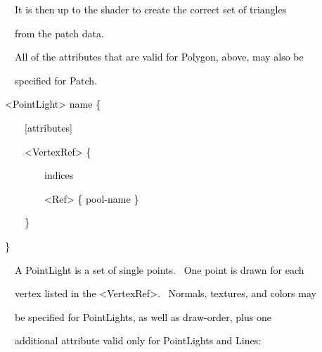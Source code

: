 \documentclass[a4paper]{article}
\newcommand\textstyleOOoComputerKeyWord[1]{\textrm{\textcolor[rgb]{0.0,0.0,0.5019608}{#1}}}
\begin{document}
{\color{black}
\textstyleOOoComputerKeyWord{\textcolor{black}{\ \ It is then up to the shader to create the correct set of triangles}}}

{\color{black}
\textstyleOOoComputerKeyWord{\textcolor{black}{\ \ from the patch data.}}}


\bigskip

{\color{black}
\textstyleOOoComputerKeyWord{\textcolor{black}{\ \ All of the attributes that are valid for Polygon, above, may also
be}}}

{\color{black}
\textstyleOOoComputerKeyWord{\textcolor{black}{\ \ specified for Patch.}}}

\clearpage
\bigskip


\bigskip


\bigskip

{\color{black}
\textstyleOOoComputerKeyWord{\textcolor{black}{{\textless}PointLight{\textgreater} name \{ }}}

{\color{black}
\textstyleOOoComputerKeyWord{\textcolor{black}{\ \ \ \ [attributes] }}}

{\color{black}
\textstyleOOoComputerKeyWord{\textcolor{black}{\ \ \ \ {\textless}VertexRef{\textgreater} \{ }}}

{\color{black}
\textstyleOOoComputerKeyWord{\textcolor{black}{\ \ \ \ \ \ \ \ indices }}}

{\color{black}
\textstyleOOoComputerKeyWord{\textcolor{black}{\ \ \ \ \ \ \ \ {\textless}Ref{\textgreater} \{ pool-name \} }}}

{\color{black}
\textstyleOOoComputerKeyWord{\textcolor{black}{\ \ \ \ \} }}}

{\color{black}
\textstyleOOoComputerKeyWord{\textcolor{black}{\}}}}


\bigskip

{\color{black}
\textstyleOOoComputerKeyWord{\textcolor{black}{\ \ A PointLight is a set of single points. \ One point is drawn for
each}}}

{\color{black}
\textstyleOOoComputerKeyWord{\textcolor{black}{\ \ vertex listed in the {\textless}VertexRef{\textgreater}. \ Normals,
textures, and colors may}}}

{\color{black}
\textstyleOOoComputerKeyWord{\textcolor{black}{\ \ be specified for PointLights, as well as draw-order, plus one}}}

{\color{black}
\textstyleOOoComputerKeyWord{\textcolor{black}{\ \ additional attribute valid only for PointLights and Lines:}}}


\bigskip
\end{document}
